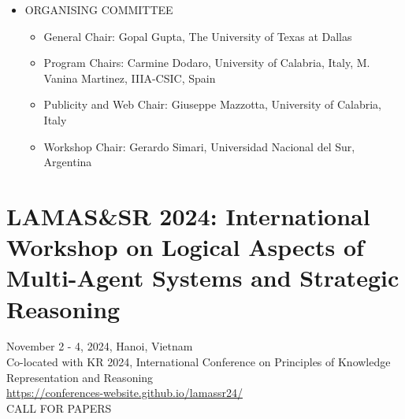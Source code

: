 \documentclass[prodmode,acmtecs]{acmsmall} %
\begin{document}
\begin{itemize}
\item  ORGANISING COMMITTEE 
 
\begin{itemize}\item  General Chair: Gopal Gupta, The University of Texas at Dallas
\item  Program Chairs: Carmine Dodaro, University of Calabria, Italy,  M. Vanina Martinez, IIIA-CSIC, Spain
\item  Publicity and Web Chair: Giuseppe Mazzotta, University of Calabria, Italy
\item  Workshop Chair: Gerardo Simari, Universidad Nacional del Sur, Argentina
\end{itemize} 
\end{itemize}\section{LAMAS\&SR 2024: International Workshop on Logical Aspects of Multi-Agent Systems and Strategic Reasoning}\label{LAMASSR2024}  November 2 - 4, 2024, Hanoi, Vietnam\\ 
  Co-located with KR 2024, International Conference on Principles of Knowledge Representation and Reasoning\\ 
  \href{https://conferences-website.github.io/lamassr24/}{https://conferences-website.github.io/lamassr24/}\\ 
CALL FOR PAPERS 
\end{document}
